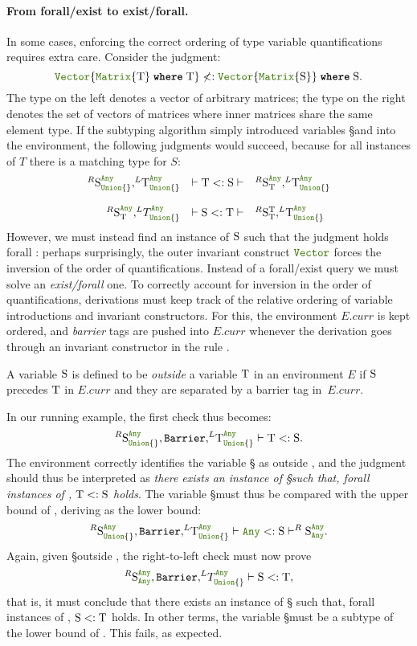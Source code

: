 \paragraph{From forall/exist to exist/forall.}  In some cases,
enforcing the correct ordering of type variable quantifications
requires extra care.  Consider the judgment:
\[ \vectyp{\wheret{\mattyp{\T}}{\T}} \nless: 
  \wheret{\vectyp{\mattyp{\S}}}{\S}. \]
The type on the left denotes a vector of arbitrary matrices;
the type on the right denotes the set of vectors of matrices where 
inner matrices share the same element type.
If the subtyping algorithm simply introduced variables \S and \T into
the environment, the following judgments would succeed, because
for all instances of \(T\) there is a matching type for \(S\):
\[
\begin{array}{rcl}
  ^R \S_{\uniontyp{}}^{\anytyp}, ^L\!\T_{\uniontyp{}}^{\anytyp} & \vdash \T <: \S
    \vdash & ^R \S_{\T}^{\anytyp}, ^L\!\T_{\uniontyp{}}^{\anytyp} \\
  \\
  ^R \S_{\T}^{\anytyp}, ^L\!T_{\uniontyp{}}^{\anytyp} & \vdash \S <: \T
    \vdash & ^R \S_{\T}^{\T}, ^L\!\T_{\uniontyp{}}^{\anytyp}
\end{array}
\]
However, we must instead find an instance of \(\S\) such that 
the judgment holds forall \T: perhaps surprisingly, the outer invariant
construct \(\jlname{Vector}\) forces the inversion of the order of quantifications.
Instead of a forall/exist query we must solve an \emph{exist/forall} one.
To correctly account for inversion in the order of quantifications,
derivations must keep track of the relative ordering of
variable introductions and invariant constructors.  For this, the
environment \(E.curr\) is kept ordered, and
\emph{barrier} tags are pushed into \(E.curr\) whenever the derivation goes through
an invariant constructor in the rule .

A variable \(\S\) is defined to be \emph{outside} a variable
\(\T\) in an environment \(E\) if \(\S\) precedes \(\T\)
in \(E.curr\) and they are separated by a barrier tag in~\(E.curr\).  

In our running example, the first check thus becomes:
\[ ^R \S_{\uniontyp{}}^{\anytyp}, \Barrier, ^L\!\T_{\uniontyp{}}^{\anytyp} 
\vdash \T <: \S. \]
\noindent The environment correctly identifies the variable \S
as outside \T, and the judgment should thus be interpreted as
\emph{there exists an instance of \S such that, forall instances of
\T, \( \T <: \S \) holds}.  The variable \S must thus be
compared with the upper bound of \T, deriving \anytyp as the lower bound:
\[ 
  ^R \S_{\uniontyp{}}^{\anytyp}, \Barrier, ^L\!\T_{\uniontyp{}}^{\anytyp} 
  \vdash \anytyp <: \S \vdash ^R \S_{\anytyp}^{\anytyp}.
\]
Again, given \S outside \T, the right-to-left check must now prove
\[ ^R \S_{\anytyp}^{\anytyp}, \Barrier, ^L\!T_{\uniontyp{}}^{\anytyp} 
\vdash \S <: \T, \]
that is, it must conclude that there exists an instance of \S
such that, forall instances of \T, \(\S <: \T\) holds.  In
other terms, the variable \S must be a subtype of the lower
bound of \T.  This fails, as expected.


